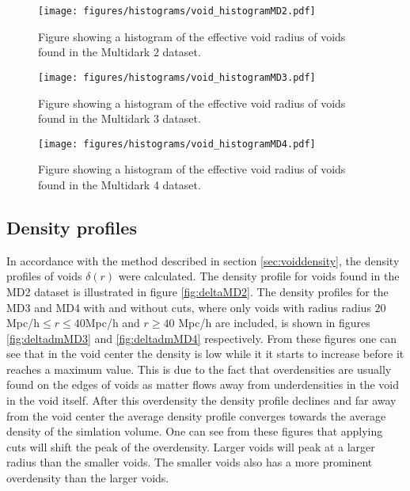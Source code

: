 \begin{figure}[H]
    \texttt{[image: figures/histograms/void\_histogramMD2.pdf]}
    \caption{Figure showing a histogram of the effective void radius of voids found in the Multidark 2 dataset.}
    \label{fig:voidhistMD2}
\end{figure}
\begin{figure}[H]
    \texttt{[image: figures/histograms/void\_histogramMD3.pdf]}
    \caption{Figure showing a histogram of the effective void radius of voids found in the Multidark 3 dataset.}
    \label{fig:voidhistMD3}
\end{figure}
\begin{figure}[H]
    \texttt{[image: figures/histograms/void\_histogramMD4.pdf]}
    \caption{Figure showing a histogram of the effective void radius of voids found in the Multidark 4 dataset.}
    \label{fig:voidhistMD4}
\end{figure}
\subsection{Density profiles}
In accordance with the method described in section \ref{sec:voiddensity}, the density profiles of voids $\delta(r)$ were calculated. The density profile for voids found in the MD2 dataset is illustrated in figure \ref{fig:deltaMD2}. The density profiles for the MD3 and MD4 with and without cuts, where only voids with radius radius $20$Mpc/h$\leq r\leq 40$Mpc/h and $r\geq 40$ Mpc/h are included, is shown in figures \ref{fig:deltadmMD3} and \ref{fig:deltadmMD4} respectively. From these figures one can see that in the void center the density is low while it it starts to increase before it reaches a maximum value. This is due to the fact that overdensities are usually found on the edges of voids as matter flows away from underdensities in the void in the void itself. After this overdensity the density profile declines and far away from the void center the average density profile converges towards the average density of the simlation volume. One can see from these figures that applying cuts will shift the peak of the overdensity. Larger voids will peak at a larger radius than the smaller voids. The smaller voids also has a more prominent overdensity than the larger voids.\\\indent
 

